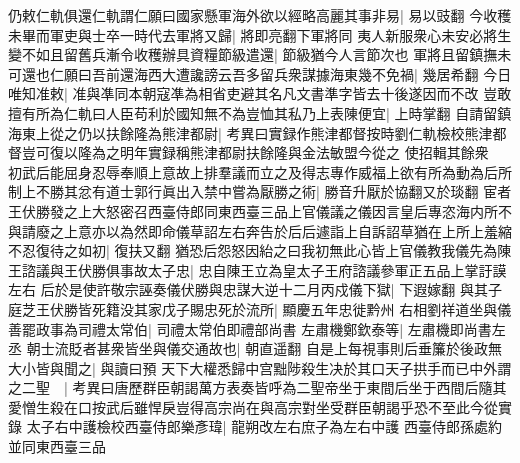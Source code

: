 仍敕仁軌俱還仁軌謂仁願曰國家懸軍海外欲以經略高麗其事非易|{
	易以豉翻}
今收穫未畢而軍吏與士卒一時代去軍將又歸|{
	將即亮翻下軍將同}
夷人新服衆心未安必將生變不如且留舊兵漸令收穫辦具資糧節級遣還|{
	節級猶今人言節次也}
軍將且留鎮撫未可還也仁願曰吾前還海西大遭讒謗云吾多留兵衆謀據海東幾不免禍|{
	幾居希翻}
今日唯知准敕|{
	准與凖同本朝寇凖為相省吏避其名凡文書準字皆去十後遂因而不改}
豈敢擅有所為仁軌曰人臣苟利於國知無不為豈恤其私乃上表陳便宜|{
	上時掌翻}
自請留鎮海東上從之仍以扶餘隆為熊津都尉|{
	考異曰實録作熊津都督按時劉仁軌檢校熊津都督豈可復以隆為之明年實録稱熊津都尉扶餘隆與金法敏盟今從之}
使招輯其餘衆　初武后能屈身忍辱奉順上意故上排羣議而立之及得志專作威福上欲有所為動為后所制上不勝其忿有道士郭行眞出入禁中嘗為厭勝之術|{
	勝音升厭於協翻又於琰翻}
宦者王伏勝發之上大怒密召西臺侍郎同東西臺三品上官儀議之儀因言皇后專恣海内所不與請廢之上意亦以為然即命儀草詔左右奔告於后后遽詣上自訴詔草猶在上所上羞縮不忍復待之如初|{
	復扶又翻}
猶恐后怨怒因紿之曰我初無此心皆上官儀教我儀先為陳王諮議與王伏勝俱事故太子忠|{
	忠自陳王立為皇太子王府諮議參軍正五品上掌訏謨左右}
后於是使許敬宗誣奏儀伏勝與忠謀大逆十二月丙戍儀下獄|{
	下遐嫁翻}
與其子庭芝王伏勝皆死籍没其家戊子賜忠死於流所|{
	顯慶五年忠徙黔州}
右相劉祥道坐與儀善罷政事為司禮太常伯|{
	司禮太常伯即禮部尚書}
左肅機鄭欽泰等|{
	左肅機即尚書左丞}
朝士流貶者甚衆皆坐與儀交通故也|{
	朝直遥翻}
自是上每視事則后垂簾於後政無大小皆與聞之|{
	與讀曰預}
天下大權悉歸中宫黜陟殺生决於其口天子拱手而已中外謂之二聖　|{
	考異曰唐歷群臣朝謁萬方表奏皆呼為二聖帝坐于東間后坐于西間后隨其愛憎生殺在口按武后雖悍戾豈得高宗尚在與高宗對坐受群臣朝謁乎恐不至此今從實錄}
太子右中護檢校西臺侍郎樂彥瑋|{
	龍朔改左右庶子為左右中護}
西臺侍郎孫處約並同東西臺三品

